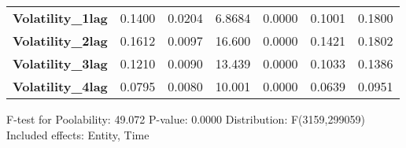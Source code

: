 \begin{center}
\begin{tabular}{lcccccc}
\textbf{Volatility\_1lag}               &       0.1400       &       0.0204       &      6.8684     &      0.0000      &       0.1001      &       0.1800       \\
\textbf{Volatility\_2lag}               &       0.1612       &       0.0097       &      16.600     &      0.0000      &       0.1421      &       0.1802       \\
\textbf{Volatility\_3lag}               &       0.1210       &       0.0090       &      13.439     &      0.0000      &       0.1033      &       0.1386       \\
\textbf{Volatility\_4lag}               &       0.0795       &       0.0080       &      10.001     &      0.0000      &       0.0639      &       0.0951       \\
\bottomrule
\end{tabular}
\end{center}

F-test for Poolability: 49.072 \newline
 P-value: 0.0000 \newline
 Distribution: F(3159,299059) \newline
  \newline
 Included effects: Entity, Time